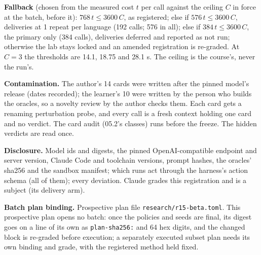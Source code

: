 \documentclass[11pt]{article}
\begin{document}
\begin{answer}
\textbf{Fallback} (chosen from the measured cost $t$ per call against the
ceiling $C$ in force at the batch, before it): $768\,t \le 3600\,C$, as
registered; else if $576\,t \le 3600\,C$, deliveries at 1 repeat per language
(192 calls; 576 in all); else if $384\,t \le 3600\,C$, the primary only (384
calls), deliveries deferred and reported as not run; otherwise the lab stays
locked and an amended registration is re-graded. At $C = 3$ the thresholds
are 14.1, 18.75 and 28.1 s. The ceiling is the course's, never the run's.

\textbf{Contamination.} The author's 14 cards were written after the pinned
model's release (dates recorded); the learner's 10 were written by the person
who builds the oracles, so a novelty review by the author checks them. Each
card gets a renaming perturbation probe, and every call is a fresh context
holding one card and no verdict. The card audit (05.2's classes) runs before
the freeze. The hidden verdicts are read once.

\textbf{Disclosure.} Model ids and digests, the pinned OpenAI-compatible
endpoint and server version, Claude Code and toolchain versions, prompt hashes, the oracles' sha256 and the sandbox manifest; which
runs act through the harness's action schema (all of them); every deviation.
Claude grades this registration and is a subject (its delivery arm).

\textbf{Batch plan binding.} Prospective plan file
\texttt{research/r15-beta.toml}. This prospective plan opens no batch: once the
policies and seeds are final, its digest goes on a line of its own as
\texttt{plan-sha256:} and 64 hex digits, and the changed block is re-graded
before execution; a separately executed subset plan needs its own binding and
grade, with the registered method held fixed.
\end{answer}
\end{document}
